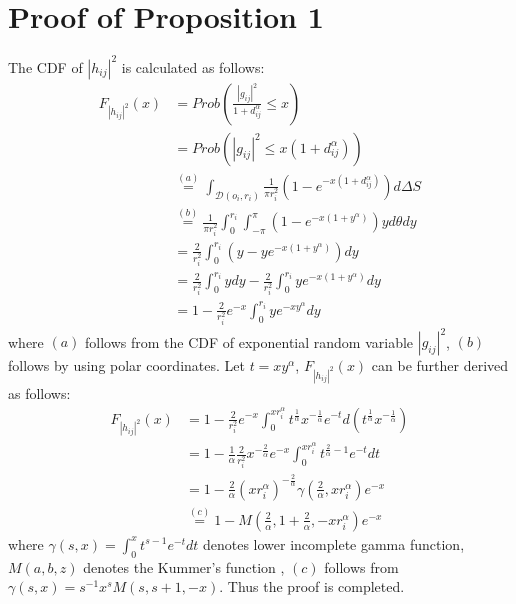 \documentclass[journal]{IEEEtran}
\begin{document}
\section{Proof of Proposition 1}
The CDF of $\left|h_{ij} \right|^2$ is calculated as follows:
\begin{align}
F_{\left|h_{ij} \right|^2} \left(x\right) &= Prob\left(\frac{\left|g_{ij}\right|^2}{1 + d_{ij}^{\alpha}} \leq x \right) \nonumber \\
& = Prob \left(\left|g_{ij}\right|^2 \leq x \left(1 + d_{ij}^\alpha\right)\right) \nonumber \\
& \overset{\left(a\right)}{=} \int_{\mathcal{D}(o_i, r_i)} \frac{1}{\pi r_i^2}\left(1 - e^{-x\left(1 + d_{ij}^{\alpha}\right)}\right) d\Delta S \nonumber\\
& \overset{\left(b\right)}{=} \frac{1}{\pi r_i^2} \int_{0}^{r_i} \int_{-\pi}^{\pi}\left(1 - e^{-x\left(1 + y^{\alpha}\right)}\right)y d \theta d y \nonumber \\
& = \frac{2}{r_i^2}\int_{0}^{r_i} \left(y - ye^{-x\left(1 + y^\alpha\right)}\right) dy \nonumber \\
& = \frac{2}{r_i^2}\int_{0}^{r_i}y dy - \frac{2}{r_i^2}\int_{0}^{r_i} y e^{-x \left(1 + y^\alpha\right)}dy \nonumber \\
& = 1 - \frac{2}{r_i^2}e^{-x} \int_{0}^{r_i}y e^{-xy^{\alpha}}dy
\end{align}
where $\left(a\right)$ follows from the CDF of exponential random variable $\left|g_{ij}\right|^2$, $\left(b\right)$ follows by using polar coordinates. Let $t = xy^{\alpha}$, $F_{\left|h_{ij} \right|^2} \left(x\right)$ can be further derived as follows:
\begin{align}
F_{\left|h_{ij} \right|^2} \left(x\right) &= 1 - \frac{2}{r_i^2}e^{-x} \int_{0}^{x r_i^{\alpha}} t^{\frac{1}{\alpha}} x^{-\frac{1}{\alpha}}e^{-t} d\left(t^{\frac{1}{\alpha}} x^{-\frac{1}{\alpha}}\right) \nonumber \\
& = 1 - \frac{1}{\alpha} \frac{2}{r_i^2} x^{-\frac{2}{\alpha}} e^{-x} \int_{0}^{x r_i^{\alpha}} t^{\frac{2}{\alpha} - 1}e^{-t} dt \nonumber \\
& = 1 - \frac{2}{\alpha} \left(x r_i^{\alpha}\right) ^{-\frac{2}{\alpha}} \gamma\left(\frac{2}{\alpha}, xr_i^{\alpha}\right)e^{-x} \nonumber \\
& \overset{\left(c\right)}{=} 1 - M\left(\frac{2}{\alpha}, 1 + \frac{2}{\alpha}, -xr_i^{\alpha}\right)e^{-x}
\end{align}
where $\gamma\left(s,x\right) = \int_{0}^{x}t^{s-1}e^{-t}dt$ denotes lower incomplete gamma function, $M\left(a,b,z\right)$ denotes the Kummer's function \cite{MAbramowitz}, $\left(c\right)$ follows from $\gamma\left(s,x\right) = s^{-1} x^s M\left(s,s+1,-x\right)$. Thus the proof is completed. 
\end{document}
